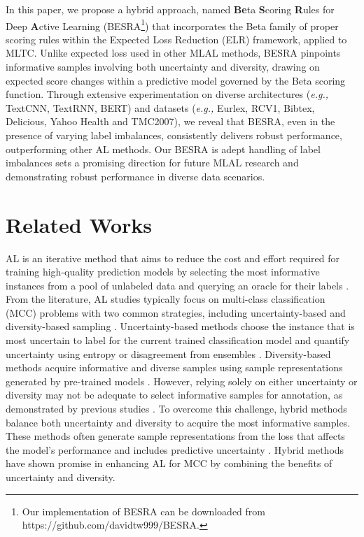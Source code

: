 \documentclass[letterpaper]{article} %
\begin{document}
In this paper, we propose a hybrid approach, named \textbf{Be}ta \textbf{S}coring \textbf{R}ules for Deep \textbf{A}ctive Learning (BESRA\footnote{Our implementation of BESRA can be downloaded from https://github.com/davidtw999/BESRA.}) that incorporates the Beta family of proper scoring rules within the Expected Loss Reduction (ELR) framework, applied to MLTC. 
Unlike expected loss used in other MLAL methods, BESRA pinpoints informative samples involving both uncertainty and diversity, drawing on expected score changes within a predictive model governed by the Beta scoring function.
Through extensive experimentation on diverse architectures ({\it e.g.,} TextCNN, TextRNN, BERT) and datasets ({\it e.g.,} Eurlex, RCV1, Bibtex, Delicious, Yahoo Health and TMC2007), we reveal that BESRA, even in the presence of varying label imbalances, consistently delivers robust performance, outperforming other AL methods. 
Our BESRA is adept handling of label imbalances sets a promising direction for future MLAL research and demonstrating robust performance in diverse data scenarios.





\section{Related Works}
\label{sec:Related}

AL is an iterative method that aims to reduce the cost and effort required for training high-quality prediction models by selecting the most informative instances from a pool of unlabeled data and querying an oracle for their labels \cite{settles2009active, BEMPS_Wei_NEURIPS2011}. From the literature, AL studies typically focus on multi-class classification (MCC) problems with two common strategies, including uncertainty-based and diversity-based sampling \cite{ren2020survey}. Uncertainty-based methods choose the instance that is most uncertain to label for the current trained classification model and quantify uncertainty using entropy or disagreement from ensembles \cite{holub2008entropy}. Diversity-based methods acquire informative and diverse samples using sample representations generated by pre-trained models \cite{ash2019deep}. However, relying solely on either uncertainty or diversity may not be adequate to select informative samples for annotation, as demonstrated by previous studies \cite{ren2020survey, TanDuBun-IEEEPAMI23}. To overcome this challenge, hybrid methods balance both uncertainty and diversity to acquire the most informative samples. These methods often generate sample representations from the loss that affects the model's performance and includes predictive uncertainty \cite{ash2019deep, TanDuBun-IEEEPAMI23}. 
Hybrid methods have shown promise in enhancing AL for MCC by combining the benefits of uncertainty and diversity.
\end{document}
